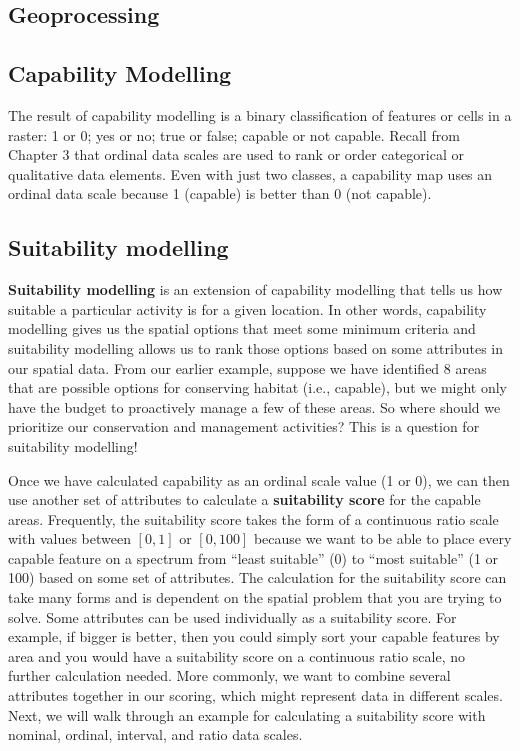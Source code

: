 \documentclass[
]{book}
\begin{document}
\hypertarget{geoprocessing}{%
\subsection{Geoprocessing}\label{geoprocessing}}

\hypertarget{capability-modelling}{%
\subsection{Capability Modelling}\label{capability-modelling}}

The result of capability modelling is a binary classification of features or cells in a raster: 1 or 0; yes or no; true or false; capable or not capable. Recall from Chapter 3 that ordinal data scales are used to rank or order categorical or qualitative data elements. Even with just two classes, a capability map uses an ordinal data scale because 1 (capable) is better than 0 (not capable).

\hypertarget{suitability-modelling}{%
\subsection{Suitability modelling}\label{suitability-modelling}}

\textbf{Suitability modelling} is an extension of capability modelling that tells us how suitable a particular activity is for a given location. In other words, capability modelling gives us the spatial options that meet some minimum criteria and suitability modelling allows us to rank those options based on some attributes in our spatial data. From our earlier example, suppose we have identified 8 areas that are possible options for conserving habitat (i.e., capable), but we might only have the budget to proactively manage a few of these areas. So where should we prioritize our conservation and management activities? This is a question for suitability modelling!

Once we have calculated capability as an ordinal scale value (1 or 0), we can then use another set of attributes to calculate a \textbf{suitability score} for the capable areas. Frequently, the suitability score takes the form of a continuous ratio scale with values between \([0,1]\) or \([0,100]\) because we want to be able to place every capable feature on a spectrum from ``least suitable'' (0) to ``most suitable'' (1 or 100) based on some set of attributes. The calculation for the suitability score can take many forms and is dependent on the spatial problem that you are trying to solve. Some attributes can be used individually as a suitability score. For example, if bigger is better, then you could simply sort your capable features by area and you would have a suitability score on a continuous ratio scale, no further calculation needed. More commonly, we want to combine several attributes together in our scoring, which might represent data in different scales. Next, we will walk through an example for calculating a suitability score with nominal, ordinal, interval, and ratio data scales.
\end{document}

